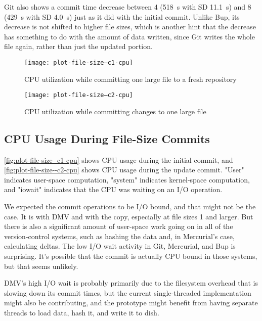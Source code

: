 Git also shows a commit time decrease between \SI{4}{\gib} (\SI{518}{\s} with SD
\SI{11.1}{\s}) and \SI{8}{\gib} (\SI{429}{\s} with SD \SI{4.0}{\s}) just as it
did with the initial commit. Unlike Bup, its decrease is not shifted to higher
file sizes, which is another hint that the decrease has something to do with the
amount of data written, since Git writes the whole file again, rather than just
the updated portion.

%


\begin{figure}[p]
    \caption{CPU utilization while committing one large file to a fresh repository}
    \label{fig:plot-file-size--c1-cpu}
    \centering
    \texttt{[image: plot-file-size--c1-cpu]}
\end{figure}

\begin{figure}[p]
    \caption{CPU utilization while committing changes to one large file}
    \label{fig:plot-file-size--c2-cpu}
    \centering
    \texttt{[image: plot-file-size--c2-cpu]}
\end{figure}

\cleardoublepage

\subsection{CPU Usage During File-Size Commits}

\autoref{fig:plot-file-size--c1-cpu} shows CPU usage during the initial
\gls{commit}, and \autoref{fig:plot-file-size--c2-cpu} shows CPU usage during
the update commit. "User" indicates user-space computation, "system" indicates
kernel-space computation, and "iowait" indicates that the CPU was waiting on an
I/O operation.

We expected the commit operations to be I/O bound, and that might not be the
case. It is with DMV and with the copy, especially at file sizes \SI{1}{\gib}
and larger. But there is also a significant amount of user-space work going on
in all of the version-control systems, such as hashing the data and, in
Mercurial's case, calculating deltas. The low I/O wait activity in Git,
Mercurial, and Bup is surprising. It's possible that the commit is actually CPU
bound in those systems, but that seems unlikely.

DMV's high I/O wait is probably primarily due to the filesystem overhead that is
slowing down its commit times, but the current single-threaded implementation
might also be contributing, and the prototype might benefit from having separate
threads to load data, hash it, and write it to dish.

